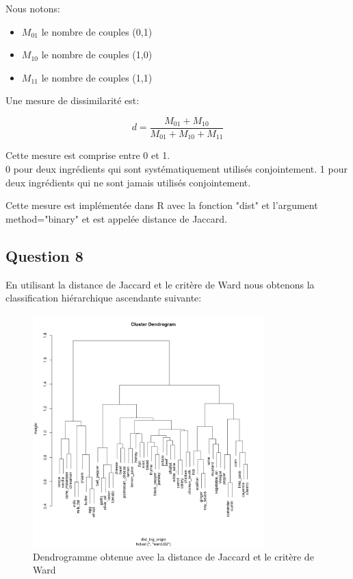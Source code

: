 \documentclass[a4paper,11pt,oneside,roman]{article}
\begin{document}
    Nous notons:
    \begin{itemize}
        \item $M_{01}$ le nombre de couples (0,1)
        \item $M_{10}$ le nombre de couples (1,0)
        \item $M_{11}$ le nombre de couples (1,1)
    \end{itemize}

    Une mesure de dissimilarité est:

    \begin{equation}
        \nonumber
        d = \frac{M_{01}+M_{10}}{M_{01}+M_{10}+M_{11}}
    \end{equation}

    Cette mesure est comprise entre 0 et 1. \\
    0 pour deux ingrédients qui sont systématiquement utilisés conjointement.
    1 pour deux ingrédients qui ne sont jamais utilisés conjointement.

    Cette mesure est implémentée dans R avec la fonction "dist" et l'argument method="binary" et est appelée distance de Jaccard. 
    
    \subsection*{Question 8}
    En utilisant la distance de Jaccard et le critère de Ward nous obtenons la classification hiérarchique ascendante suivante:
    \begin{figure}
        \centering
        \includegraphics[width=0.8\textwidth]{imgs/CAH_dendrogramme_ingredients_binary.png}
        \caption{Dendrogramme obtenue avec la distance de Jaccard et le critère de Ward}
        \label{fig_K_means_choix_K}
    \end{figure}
\end{document}
